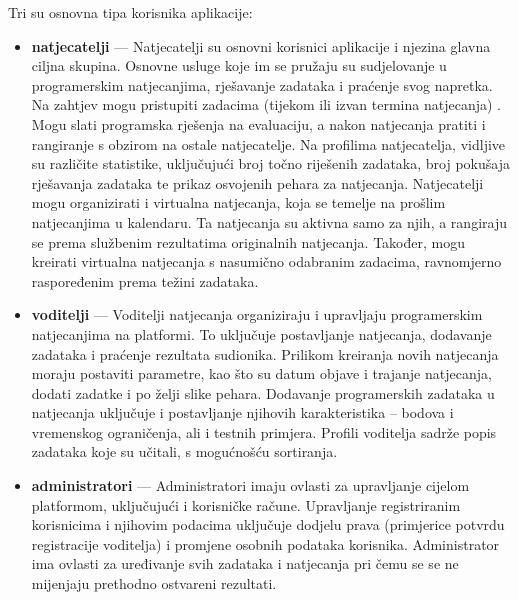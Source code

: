		Tri su osnovna tipa korisnika aplikacije:
		\begin{itemize}
			\item \textbf{natjecatelji} --- Natjecatelji su osnovni korisnici aplikacije i njezina glavna ciljna skupina. Osnovne usluge koje im se pružaju su sudjelovanje u programerskim natjecanjima, rješavanje zadataka i praćenje svog napretka. Na zahtjev mogu pristupiti zadacima (tijekom ili izvan termina natjecanja) . Mogu slati programska rješenja na evaluaciju, a nakon natjecanja pratiti i rangiranje s obzirom na ostale natjecatelje. Na profilima natjecatelja, vidljive su različite statistike, uključujući broj točno riješenih zadataka, broj pokušaja rješavanja zadataka te prikaz osvojenih pehara za natjecanja. Natjecatelji mogu organizirati i virtualna natjecanja, koja se temelje na prošlim natjecanjima u kalendaru. Ta natjecanja su aktivna samo za njih, a rangiraju se prema službenim rezultatima originalnih natjecanja. Također, mogu kreirati virtualna natjecanja s nasumično odabranim zadacima, ravnomjerno raspoređenim prema težini zadataka.
 			\item \textbf{voditelji} --- Voditelji natjecanja organiziraju i upravljaju programerskim natjecanjima na platformi. To uključuje postavljanje natjecanja, dodavanje zadataka i praćenje rezultata sudionika. Prilikom kreiranja novih natjecanja moraju postaviti parametre, kao što su datum objave i trajanje natjecanja, dodati zadatke i po želji slike pehara. Dodavanje programerskih zadataka u natjecanja uključuje i postavljanje njihovih karakteristika -- bodova i vremenskog ograničenja, ali i testnih primjera. Profili voditelja sadrže popis zadataka koje su učitali, s mogućnošću sortiranja.
			\item \textbf{administratori} --- Administratori imaju ovlasti za upravljanje cijelom platformom, uključujući i korisničke račune. Upravljanje registriranim korisnicima i njihovim podacima uključuje dodjelu prava (primjerice potvrdu registracije voditelja) i promjene osobnih podataka korisnika. Administrator ima ovlasti za uređivanje svih zadataka i natjecanja pri čemu se se ne mijenjaju prethodno ostvareni rezultati.
		\end{itemize}
		
